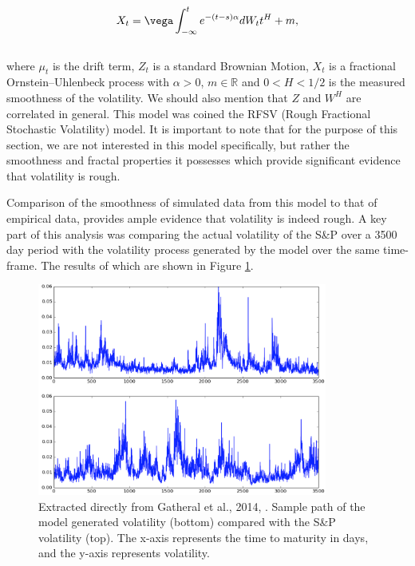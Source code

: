 \documentclass[12pt,oneside]{article}
\begin{document}
\begin{equation}
\label{eqn:OU_rough}
X_{t}=\vega\int_{-\infty}^{t} e^{-(t-s)\alpha}dW_{t}t^{H}+m,
\end{equation}
\\

where $\mu_{t}$ is the drift term, $Z_{t}$ is a standard Brownian Motion, $X_{t}$ is a fractional Ornstein–Uhlenbeck process with $\alpha>0$, $m\in\mathbb{R}$ and $0<H<1/2$ is the measured smoothness of the volatility. We should also mention that $Z$ and $W^{H}$ are correlated in general. This model was coined the RFSV (Rough Fractional Stochastic Volatility) model. It is important to note that for the purpose of this section, we are not interested in this model specifically, but rather the smoothness and fractal properties it possesses which provide significant evidence that volatility is rough.

Comparison of the smoothness of simulated data from this model to that of empirical data, provides ample evidence that volatility is indeed rough. A key part of this analysis was comparing the actual volatility of the S\&P over a 3500 day period with the volatility process generated by the model over the same time-frame. The results of which are shown in Figure \ref{fig:gatheral_2014_volplots}.

\begin{figure}[htpb]

    \centering
    \includegraphics[width=0.85\textwidth ]{figs/gatheral_2014_fig36_p22}
    \caption{Extracted directly from Gatheral et al., 2014, \cite[Figure~3.6]{gatheral2014volatility}. Sample path of the model generated volatility (bottom) compared with the S\&P volatility (top). The x-axis represents the time to maturity in days, and the y-axis represents volatility.}
    \label{fig:gatheral_2014_volplots}
\end{figure}
\\
\end{document}
